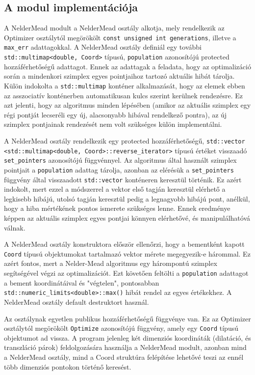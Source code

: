 \documentclass[oneside,titlepage,12pt,a4paper]{report}
\begin{document}
\subsection*{A modul implementációja}

\par A NelderMead modult a NelderMead osztály alkotja, mely rendelkezik az Optimizer osztálytól megörökölt \texttt{const unsigned int generations}, illetve a \texttt{max\_err} adattagokkal. A NelderMead osztály definiál egy további \texttt{std::multimap<double, Coord>} típusú, \texttt{population} azonosítójú protected hozzáférhetőségű adattagot. Ennek az adattagak a feladata, hogy az optimalizáció során a mindenkori szimplex egyes pointjaihoz tartozó aktuális hibát tárolja. Külön indokolta a \texttt{std::multimap} konténer alkalmazását, hogy az elemek ebben az asszociatív konténerben automatikusan kulcs szerint kerülnek rendezésre. Ez azt jelenti, hogy az algoritmus minden lépésében (amikor az aktuális szimplex egy régi pontját lecseréli egy új, alacsonyabb hibával rendelkező pontra), az új szimplex pontjainak rendezését nem volt szükséges külön implementálni. 
\par A NelderMead osztály rendelkezik egy protected hozzáférhetőségű, \texttt{std::vector} \texttt{<std::multimap<double, Coord>::reverse\_iterator>} típusú értéket visszaadó \linebreak \texttt{set\_pointers} azonosítójú függvénnyel. Az algoritmus által használt szimplex pointjait a \texttt{population} adattag tárolja, azonban az elérésük a \texttt{set\_pointers} függvény által visszaadott \texttt{std::vector} konténeren keresztül történik. Ez azért indokolt, mert ezzel a módszerrel a vektor első tagján keresztül elérhető a legkisebb hibájú, utolsó tagján keresztül pedig a legnagyobb hibájú pont, anélkül, hogy a hiba mértékének pontos ismerete szükséges lenne. Ennek eredménye képpen az aktuális szimplex egyes pontjai könnyen elérhetővé, és manipulálhatóvá válnak. 

\par A NelderMead osztály konstruktora először ellenőrzi, hogy a bementként kapott \texttt{Coord} típusú objektumokat tartalmazó vektor mérete megegyezik-e hárommal. Ez azért fontos, mert a Nelder-Mead algoritmus egy hárompontú szimplex segítségével végzi az optimalizációt. Ezt követően feltölti a \texttt{population} adattagot a bement koordinátáival és "végtelen", pontosabban \texttt{std::numeric\_limits<double>::max()} hibát rendel az egyes értékekhez. A NelderMead osztály default destruktort használ. 
\par Az osztálynak egyetlen publikus hozzáférhetőségű függvénye van. Ez az Optimizer osztálytól megörökölt \texttt{Optimize} azonosítójú függvény, amely egy \texttt{Coord} típusú objektumot ad vissza. A program jelenleg két dimenziós koordináták (dilatáció, és transzláció párok) feldolgozására használja a NelderMead modult, azonban mind a NelderMead osztály, mind a Coord struktúra felépítése lehetővé teszi az ennél több dimenziós pontokon történő keresést. 
\end{document}
